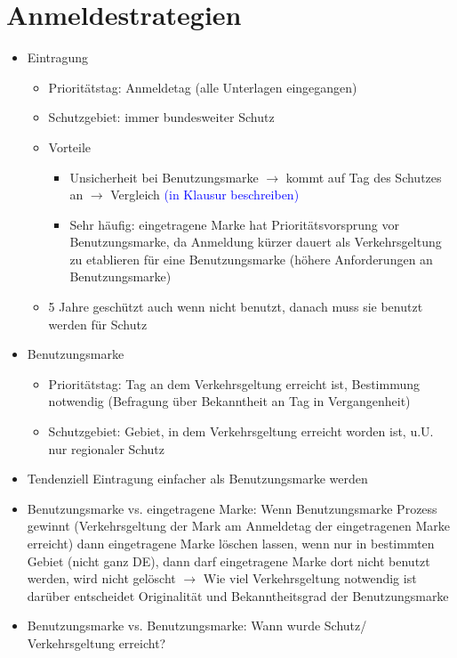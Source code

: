 \documentclass{report}
\begin{document}
\section{Anmeldestrategien}
\begin{itemize}
	\item Eintragung
	\begin{itemize}
		\item Prioritätstag: Anmeldetag (alle Unterlagen eingegangen)
		\item Schutzgebiet: immer bundesweiter Schutz
		\item Vorteile
		\begin{itemize}
			\item Unsicherheit bei Benutzungsmarke $\rightarrow$ kommt auf Tag des Schutzes an $\rightarrow$ Vergleich \textcolor{blue}{(in Klausur beschreiben)}
			\item Sehr häufig: eingetragene Marke hat Prioritätsvorsprung vor Benutzungsmarke, da Anmeldung kürzer dauert als Verkehrsgeltung zu etablieren für eine Benutzungsmarke (höhere Anforderungen an Benutzungsmarke)
		\end{itemize}
		\item 5 Jahre geschützt auch wenn nicht benutzt, danach muss sie benutzt werden für Schutz
	\end{itemize}
	\item Benutzungsmarke
	\begin{itemize}
		\item Prioritätstag: Tag an dem Verkehrsgeltung erreicht ist, Bestimmung notwendig (Befragung über Bekanntheit an Tag in Vergangenheit)
		\item Schutzgebiet: Gebiet, in dem Verkehrsgeltung erreicht worden ist, u.U. nur regionaler Schutz
	\end{itemize}
	\item Tendenziell Eintragung einfacher als Benutzungsmarke werden
	\item Benutzungsmarke vs. eingetragene Marke:
	\newline Wenn Benutzungsmarke Prozess gewinnt (Verkehrsgeltung der Mark am Anmeldetag der eingetragenen Marke erreicht)
	\newline dann eingetragene Marke löschen lassen, wenn nur in bestimmten Gebiet (nicht ganz DE), dann darf eingetragene Marke dort nicht benutzt werden, wird nicht gelöscht
	\newline $\rightarrow$ Wie viel Verkehrsgeltung notwendig ist darüber entscheidet Originalität und Bekanntheitsgrad der Benutzungsmarke
	\item Benutzungsmarke vs. Benutzungsmarke:
	\newline Wann wurde Schutz/ Verkehrsgeltung erreicht?
\end{itemize}
\end{document}
